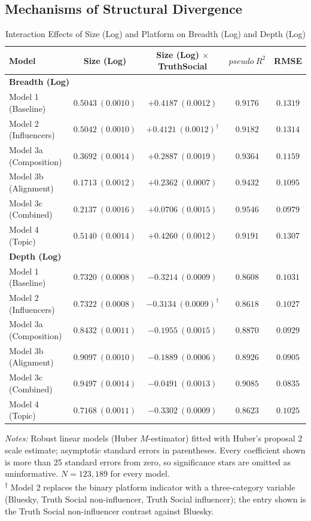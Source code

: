 \documentclass[letterpaper]{article} %
\newcommand{\rev}[1]{{\color{blue}#1}}
\begin{document}
\subsection{Mechanisms of Structural Divergence}

\begin{table}[]
\centering
\caption{Interaction Effects of Size (Log) and Platform on Breadth (Log) and Depth (Log)}
\label{model}
\begin{tabular}{lcccc}
\hline
\textbf{Model} & Size (Log) & Size (Log) $\times$ TruthSocial & $pseudo\ R^2$ & RMSE  \\
\hline
\hline
\multicolumn{5}{l}{\textbf{Breadth (Log)}} \\
\hline
Model 1 (Baseline) & $0.5043\ (0.0010)$ & $+0.4187\ (0.0012)$ & $0.9176$ & $0.1319$ \\
Model 2 (Influencers) & $0.5042\ (0.0010)$ & $+0.4121\ (0.0012)^{\dagger}$ & $0.9182$ & $0.1314$ \\
Model 3a (Composition) & $0.3692\ (0.0014)$ & $+0.2887\ (0.0019)$ & $0.9364$ & $0.1159$ \\
Model 3b (Alignment) & $0.1713\ (0.0012)$ & $+0.2362\ (0.0007)$ & $0.9432$ & $0.1095$ \\
Model 3c (Combined) & $0.2137\ (0.0016)$ & $+0.0706\ (0.0015)$ & $0.9546$ & $0.0979$ \\
Model 4 (Topic) & $0.5140\ (0.0014)$ & $+0.4260\ (0.0012)$ & $0.9191$ & $0.1307$ \\
\hline
\hline
\multicolumn{5}{l}{\textbf{Depth (Log)}} \\
\hline
Model 1 (Baseline) & $0.7320\ (0.0008)$ & $-0.3214\ (0.0009)$ & $0.8608$ & $0.1031$ \\
Model 2 (Influencers) & $0.7322\ (0.0008)$ & $-0.3134\ (0.0009)^{\dagger}$ & $0.8618$ & $0.1027$ \\
Model 3a (Composition) & $0.8432\ (0.0011)$ & $-0.1955\ (0.0015)$ & $0.8870$ & $0.0929$ \\
Model 3b (Alignment) & $0.9097\ (0.0010)$ & $-0.1889\ (0.0006)$ & $0.8926$ & $0.0905$ \\
Model 3c (Combined) & $0.9497\ (0.0014)$ & $-0.0491\ (0.0013)$ & $0.9085$ & $0.0835$ \\
Model 4 (Topic) & $0.7168\ (0.0011)$ & $-0.3302\ (0.0009)$ & $0.8623$ & $0.1025$ \\
\hline
\hline
\end{tabular}

\begin{minipage}{0.95\linewidth}
\footnotesize
\rev{\textit{Notes:} Robust linear models (Huber $M$-estimator) fitted with Huber's proposal 2 scale estimate; asymptotic standard errors in parentheses. Every coefficient shown is more than 25 standard errors from zero, so significance stars are omitted as uninformative. $N=123{,}189$ for every model.\\
\textsuperscript{†} Model 2 replaces the binary platform indicator with a three-category variable (Bluesky, Truth Social non-influencer, Truth Social influencer); the entry shown is the Truth Social non-influencer contrast against Bluesky.}
\end{minipage}
\end{table}
\end{document}
